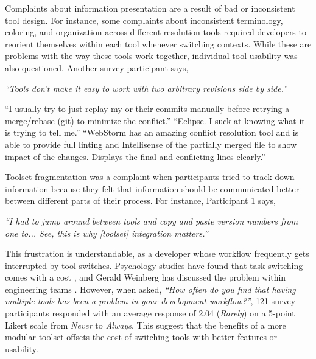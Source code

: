 Complaints about information presentation are a result of bad or inconsistent tool design. For instance, some complaints about inconsistent terminology, coloring, and organization across different resolution tools required developers to reorient themselves within each tool whenever switching contexts. While these are problems with the way these tools work together, individual tool usability was also questioned. Another survey participant says, 
\begin{displayquote}
\textit{``Tools don't make it easy to work with two arbitrary revisions side by side.''}
\end{displayquote}
``I usually try to just replay my or their commits manually before retrying a merge/rebase (git) to minimize the conflict.''
``Eclipse. I suck at knowing what it is trying to tell me.''
``WebStorm has an amazing conflict resolution tool and is able to provide full linting and Intellisense of the partially merged file to show impact of the changes. Displays the final and conflicting lines clearly.''


Toolset fragmentation was a complaint when participants tried to track down information because they felt that information should be communicated better between different parts of their process. For instance, Participant 1 says, 

\begin{displayquote}
\textit{``I had to jump around between tools and copy and paste version numbers from one to... See, this is why [toolset] integration matters.''}
\end{displayquote}

This frustration is understandable, as a developer whose workflow frequently gets interrupted by tool switches. Psychology studies have found that task switching comes with a cost \cite{Meiran2000}\cite{gopher2000switching}, and Gerald Weinberg has discussed the problem within engineering teams \cite{Weinberg1992}. However, when asked, \textit{``How often do you find that having multiple tools has been a problem in your development workflow?''}, 121 survey participants responded with an average response of 2.04 (\textit{Rarely}) on a 5-point Likert scale from \textit{Never} to \textit{Always}. This suggest that the benefits of a more modular toolset offsets the cost of switching tools with better features or usability. 


